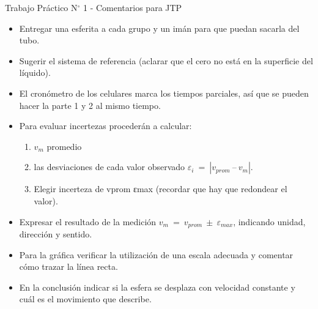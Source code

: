 \documentclass[a4paper, 12pt, usenames]{report}
\begin{document}
  \pagestyle{empty}
  \thispagestyle{empty}

  \begin{center}
      \Large Trabajo Práctico N$^{\circ}$ 1 - Comentarios para JTP
  \end{center}

\begin{itemize}
  \item Entregar una esferita a cada grupo y un imán para que puedan sacarla del tubo.
  \item Sugerir el sistema de referencia (aclarar que el cero no está en la superficie del líquido).
  \item El cronómetro de los celulares marca los tiempos parciales, así que se pueden hacer la parte 1 y 2 al mismo tiempo.
  \item Para evaluar incertezas procederán a calcular:
  \begin{enumerate}
    \item $v_m$ promedio
    \item las desviaciones de cada valor observado $\varepsilon_i \ = \ | v_{prom} \ – \ v_m |$.
    \item Elegir incerteza de vprom εmax (recordar que hay que redondear el valor).
  \end{enumerate}

  \item Expresar el resultado de la medición $v_m \ = \ v_{prom} \ \pm \ \varepsilon_{max}$, indicando unidad, dirección y sentido.
  \item Para la gráfica verificar la utilización de una escala adecuada y comentar cómo trazar la línea recta.
  \item En la conclusión indicar si la esfera se desplaza con velocidad constante y cuál es el movimiento que describe.
\end{itemize}
\end{document}
